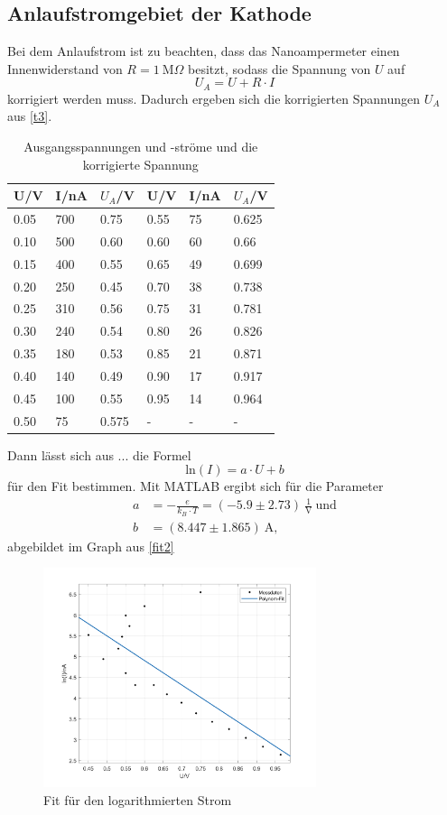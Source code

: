  \subsection{Anlaufstromgebiet der Kathode}
 Bei dem Anlaufstrom ist zu beachten, dass das Nanoampermeter einen Innenwiderstand von $R=1\ \textrm{M}\Omega$ besitzt, sodass die Spannung von $U$ auf
 \begin{equation*}
   U_{A}=U+R\cdot I
 \end{equation*}
 korrigiert werden muss. Dadurch ergeben sich die korrigierten Spannungen $U_{A}$ aus \autoref{t3}.
 \begin{table}[H]
 \centering
 \caption{Ausgangsspannungen und -ströme und die korrigierte Spannung}
 \begin{tabular}{l|l|l|l|l|l}
 U/V & I/nA & $U_{A}$/V & U/V & I/nA & $U_{A}$/V\\\hline
 0.05 & 700 & 0.75 & 0.55 & 75 & 0.625\\
 0.10 & 500 & 0.60 & 0.60 & 60 & 0.66\\
 0.15 & 400 & 0.55 & 0.65 & 49 & 0.699\\
 0.20 & 250 & 0.45 & 0.70 & 38 & 0.738\\
 0.25 & 310 & 0.56 & 0.75 & 31 & 0.781\\
 0.30 & 240 & 0.54 & 0.80 & 26 & 0.826\\
 0.35 & 180 & 0.53 & 0.85 & 21 & 0.871\\
 0.40 & 140 & 0.49 & 0.90 & 17 & 0.917\\
 0.45 & 100 & 0.55 & 0.95 & 14 & 0.964\\
 0.50 & 75 & 0.575 & - & - & -\\\hline
 \end{tabular}
 \label{t3}
 \end{table}
 Dann lässt sich aus ... die Formel 
 \begin{equation*}
   \textrm{ln}(I)=a\cdot U+b
 \end{equation*}
 für den Fit bestimmen. Mit MATLAB ergibt sich für die Parameter
 \begin{align*}
   a&=-\frac{e}{k_{B}\cdot T}=(-5.9 \pm 2.73)\ \frac{1}{\textrm{V}}\ \textrm{und}\\
   b&=(8.447 \pm 1.865)\ \textrm{A},
 \end{align*}
 abgebildet im Graph aus \autoref{fit2}
 \begin{figure}[H]
 \centering
 \includegraphics[width=8cm]{linfit.png}
 \caption{Fit für den logarithmierten Strom}
 \label{fit2}
 \end{figure}
